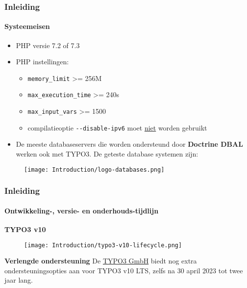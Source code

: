 
\begin{frame}[fragile]
	\frametitle{Inleiding}
	\framesubtitle{Systeemeisen}

	\begin{itemize}
		\item PHP versie 7.2 of 7.3
		\item PHP instellingen:

			\begin{itemize}
				\item \texttt{memory\_limit} >= 256M
				\item \texttt{max\_execution\_time} >= 240s
				\item \texttt{max\_input\_vars} >= 1500
				\item compilatieoptie \texttt{-}\texttt{-disable-ipv6} moet \underline{niet} worden gebruikt
			\end{itemize}

		\item De meeste databaseservers die worden ondersteund door \textbf{Doctrine DBAL} werken ook met TYPO3.
		De geteste database systemen zijn:
	\end{itemize}

	\begin{figure}
		\texttt{[image: Introduction/logo-databases.png]}
	\end{figure}

\end{frame}


\begin{frame}[fragile]
	\frametitle{Inleiding}
	\framesubtitle{Ontwikkeling-, versie- en onderhouds-tijdlijn}

	\textbf{TYPO3 v10}

	\begin{figure}
		\texttt{[image: Introduction/typo3-v10-lifecycle.png]}
	\end{figure}

	\textbf{Verlengde ondersteuning}\newline
	\smaller
	De \href{https://typo3.com}{TYPO3 GmbH} biedt nog extra ondersteuningsopties aan
	voor TYPO3 v10 LTS, zelfs na 30 april 2023 tot twee jaar lang.
	\normalsize

\end{frame}

